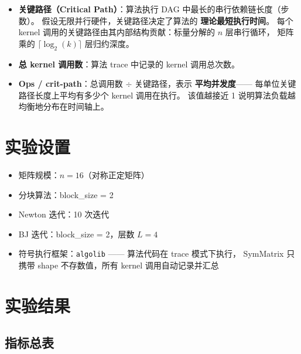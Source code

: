 \documentclass[11pt,a4paper]{ctexart}
\begin{document}
\begin{itemize}[leftmargin=*]
    \item \textbf{关键路径（Critical Path）}：算法执行 DAG 中最长的串行依赖链长度（步数）。
          假设无限并行硬件，关键路径决定了算法的 \textbf{理论最短执行时间}。
          每个 kernel 调用的关键路径由其内部结构贡献：标量分解的 $n$ 层串行循环，
          矩阵乘的 $\lceil\log_2(k)\rceil$ 层归约深度。
    \item \textbf{总 kernel 调用数}：算法 trace 中记录的 kernel 调用总次数。
    \item \textbf{Ops / crit-path}：总调用数 $\div$ 关键路径，表示 \textbf{平均并发度}——
          每单位关键路径长度上平均有多少个 kernel 调用在执行。
          该值越接近 1 说明算法负载越均衡地分布在时间轴上。
\end{itemize}

\section{实验设置}

\begin{itemize}[leftmargin=*]
    \item 矩阵规模：$n = 16$（对称正定矩阵）
    \item 分块算法：block\_size = 2
    \item Newton 迭代：10 次迭代
    \item BJ 迭代：block\_size = 2，层数 $L = 4$
    \item 符号执行框架：\texttt{algolib} —— 算法代码在 trace 模式下执行，
          SymMatrix 只携带 shape 不存数值，所有 kernel 调用自动记录并汇总
\end{itemize}

\section{实验结果}

\subsection{指标总表}
\end{document}

